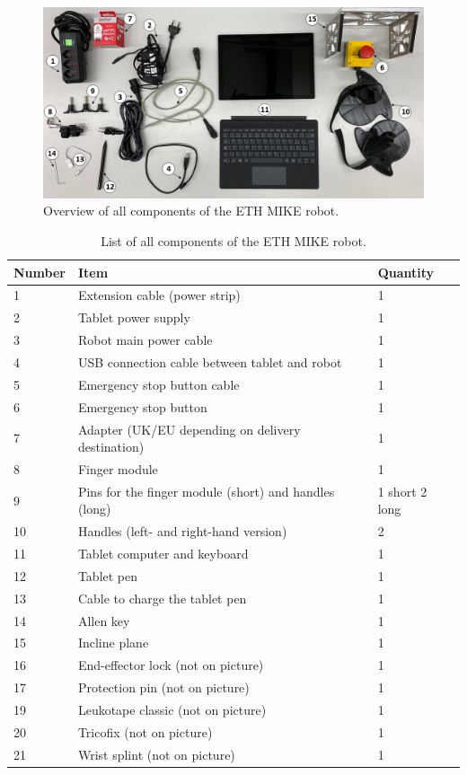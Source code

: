 \documentclass[10pt,oneside,a4paper]{article}
\begin{document}
\begin{figure}[h!]
\begin{center}
\includegraphics[width=\columnwidth]{images/Hardware/parts_annotated.png}
\caption{Overview of all components of the ETH MIKE robot.}
\label{fig:parts}
\end{center}
\end{figure}

\begin{table}[h!]
\centering
\begin{tabular}{lll}
Number & Item & Quantity\\
\hline
1 & Extension cable (power strip) & 1 \\
2 & Tablet power supply & 1 \\
3 & Robot main power cable & 1 \\
4 & USB connection cable between tablet and robot & 1 \\
5 & Emergency stop button cable & 1 \\
6 & Emergency stop button & 1 \\
7 & Adapter (UK/EU depending on delivery destination) & 1 \\
8 & Finger module & 1 \\
9 & Pins for the finger module (short) and handles (long) & 1 short 2 long \\
10 & Handles (left- and right-hand version) & 2 \\
11 & Tablet computer and keyboard & 1 \\
12 & Tablet pen & 1 \\
13 & Cable to charge the tablet pen & 1 \\
14 & Allen key & 1 \\
15 & Incline plane & 1 \\
16 & End-effector lock (not on picture) & 1 \\
17 & Protection pin (not on picture) & 1 \\
19 & Leukotape classic (not on picture) & 1 \\
20 & Tricofix (not on picture) & 1 \\
21 & Wrist splint (not on picture) & 1 \\
\end{tabular}
\caption{List of all components of the ETH MIKE robot.}
\label{tab:parts}
\end{table}
\end{document}
